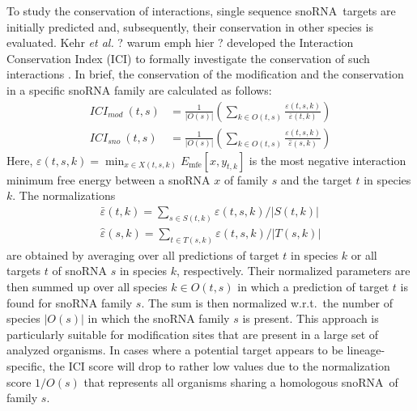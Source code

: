 \documentclass[preprint,3p,times,twocolumn]{elsarticle}
\newcommand{\JH}[1]{\begingroup\color{purple}#1\endgroup}
\newcommand{\sno}{snoRNA}
\begin{document}
To study the conservation of interactions, single sequence \sno\ targets
are initially predicted and, subsequently, their conservation in other
species is evaluated. Kehr \emph{et al.} \JH{? warum emph hier ?} developed the Interaction
Conservation Index (ICI) to formally investigate the conservation of such
interactions \cite{Kehr:2014}. In brief, the conservation of the
modification and the conservation in a specific snoRNA family are
calculated as follows:
\begin{equation}
  \begin{split}
    ICI_{mod}\:(t,s) & = \frac{1}{|O(s)|} \left( \sum_{k\in O(t,s)} \frac{\varepsilon(t,s,k)}{\bar\varepsilon(t,k)} \right) \\
    ICI_{sno}\:(t,s) & = \frac{1}{|O(s)|} \left( \sum_{k\in O(t,s)} \frac{\varepsilon(t,s,k)}{\hat\varepsilon(s,k)} \right)
  \end{split}
\end{equation}
Here, $ \varepsilon(t,s,k) = \min_{x\in X(t,s,k)}
E_{\textrm{mfe}}[x,y_{t,k}] $ is the most negative interaction minimum free
energy between a snoRNA $x$ of family $s$ and the target $t$ in species
$k$. The normalizations 
\begin{equation}
\begin{split}
\bar\varepsilon(t,k)=\sum_{s\in
  S(t,k)}\varepsilon(t,s,k)/|S(t,k)| \\
 \hat\varepsilon(s,k)=\sum_{t\in
  T(s,k)}\varepsilon(t,s,k)/|T(s,k)|
\end{split}
\end{equation}
are obtained by averaging over all predictions of target $t$ in
species $k$ or all targets $t$ of snoRNA $s$ in species $k$,
respectively.  Their normalized parameters are then summed up over all
species $k\in O(t,s)$ in which a prediction of target $t$ is found for
snoRNA family $s$. The sum is then normalized w.r.t.\ the number of
species $|O(s)|$ in which the snoRNA family $s$ is present. This
approach is particularly suitable for modification sites that are
present in a large set of analyzed organisms. In cases where a
potential target appears to be lineage-specific, the ICI score will
drop to rather low values due to the normalization score $1/O(s)$ that
represents all organisms sharing a homologous \sno\ of family $s$.
\end{document}

